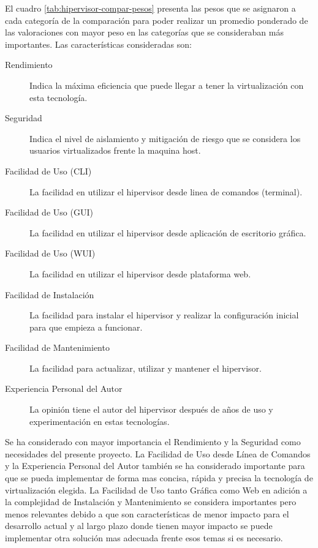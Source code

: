 El cuadro \ref{tab:hipervisor-compar-pesos} presenta las pesos que se asignaron a cada categoría de la comparación para poder realizar un promedio ponderado de las valoraciones con mayor peso en las categorías que se consideraban más importantes. Las características consideradas son:
\begin{description}
	\item[Rendimiento] Indica la máxima eficiencia que puede llegar a tener la virtualización con esta tecnología.
    \item[Seguridad] Indica el nivel de aislamiento y mitigación de riesgo que se considera los usuarios virtualizados frente la maquina host.
    \item[Facilidad de Uso (CLI)] La facilidad en utilizar el hipervisor desde linea de comandos (terminal).
    \item[Facilidad de Uso (GUI)] La facilidad en utilizar el hipervisor desde aplicación de escritorio gráfica.
    \item[Facilidad de Uso (WUI)] La facilidad en utilizar el hipervisor desde plataforma web.
    \item[Facilidad de Instalación] La facilidad para instalar el hipervisor y realizar la configuración inicial para que empieza a funcionar.
    \item[Facilidad de Mantenimiento] La facilidad para actualizar, utilizar y mantener el hipervisor.
    \item[Experiencia Personal del Autor] La opinión tiene el autor del hipervisor después de años de uso y experimentación en estas tecnologías.
\end{description}
Se ha considerado con mayor importancia el Rendimiento y la Seguridad como necesidades del presente proyecto. La Facilidad de Uso desde Línea de Comandos y la Experiencia Personal del Autor también se ha considerado importante para que se pueda implementar de forma mas concisa, rápida y precisa la tecnología de virtualización elegida. La Facilidad de Uso tanto Gráfica como Web en adición a la complejidad de Instalación y Mantenimiento se considera importantes pero menos relevantes debido a que son características de menor impacto para el desarrollo actual y al largo plazo donde tienen mayor impacto se puede implementar otra solución mas adecuada frente esos temas si es necesario. 

